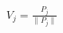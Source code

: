 \documentclass[preview]{standalone}
\begin{document}
\begin{align*}
V_j=\frac{P_j}{\|P_j\|}
\end{align*}
\end{document}
